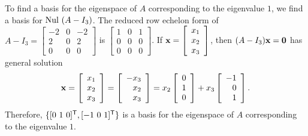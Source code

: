 \begin{example}
\item To find a basis for the eigenspace of $A$ corresponding to the eigenvalue $1$, we find a basis for $\text{Nul } (A-I_3)$. The reduced row echelon form of $A - I_ 3 = \left[ \begin{array}{rcr} -2&0&-2 \\ 2&0&2 \\ 0&0&0 \end{array}\right]$ is $\left[ \begin{array}{ccc} 1&0&1 \\ 0&0&0 \\ 0&0&0 \end{array}\right]$. If $\mathbf{x} = \left[ \begin{array}{c} x_1\\x_2\\x_3 \end{array} \right]$, then $(A-I_3)\mathbf{x} = \mathbf{0}$ has general solution 
\[\mathbf{x} = \left[ \begin{array}{c} x_1\\x_2\\x_3 \end{array} \right] = \left[ \begin{array}{r} -x_3\\x_2\\x_3 \end{array} \right] = x_2 \left[ \begin{array}{c} 0\\1\\0 \end{array} \right] + x_3\left[ \begin{array}{r} -1\\0\\1 \end{array} \right].\]
Therefore, $\{[0 \ 1 \ 0]^{\tr}, [-1 \ 0 \ 1]^{\tr}\}$ is a basis for the eigenspace of $A$ corresponding to the eigenvalue $1$. 


\end{example}
